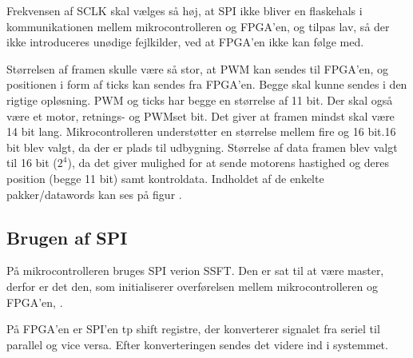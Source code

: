 Frekvensen af SCLK skal vælges så høj, at SPI ikke bliver en flaskehals i kommunikationen mellem mikrocontrolleren og FPGA’en, og tilpas lav, så der ikke introduceres unødige fejlkilder, ved at FPGA’en ikke kan følge med.

Størrelsen af framen skulle være så stor, at PWM kan sendes til FPGA’en, og positionen i form af ticks kan sendes fra FPGA’en. Begge skal kunne sendes i den rigtige opløsning. PWM og ticks har begge en størrelse af 11 bit. Der skal også være et motor, retnings- og PWMset bit. Det giver at framen mindst skal være 14 bit lang. Mikrocontrolleren understøtter en størrelse mellem fire og 16 bit.16 bit blev valgt, da der er plads til udbygning.
Størrelse af data framen blev valgt til 16 bit ($2^4$), da det giver mulighed for at sende motorens hastighed og deres position (begge 11 bit) samt kontroldata. Indholdet af de enkelte pakker/datawords kan ses på figur \label{tb:protokol1}.

\subsection{Brugen af SPI}


På mikrocontrolleren bruges SPI verion SSFT. Den er sat til at være master, derfor er det den, som initialiserer overførelsen mellem mikrocontrolleren og FPGA'en, \citep[Kap. 13]{lm3s6965}.

På FPGA'en er SPI'en tp shift registre, der konverterer signalet fra seriel til parallel og vice versa. Efter konverteringen sendes det videre ind i systemmet. 

%

